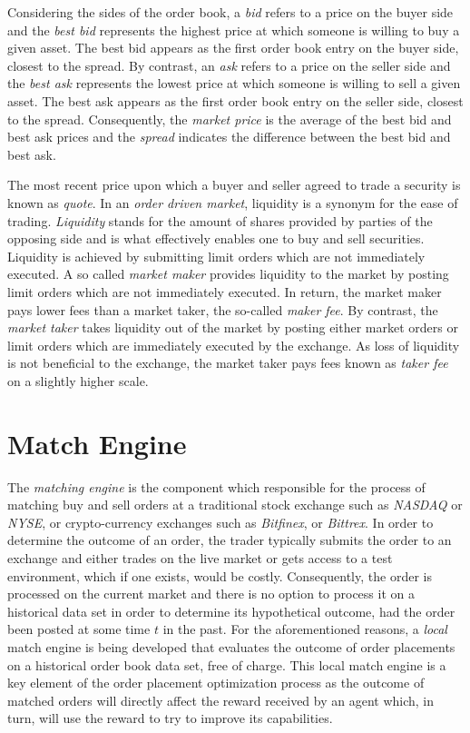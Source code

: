 Considering the sides of the order book, a \textit{bid} refers to a price on the buyer side and the \textit{best bid} represents the highest price at which someone is willing to buy a given asset.
The best bid appears as the first order book entry on the buyer side, closest to the spread.
By contrast, an \textit{ask} refers to a price on the seller side and the \textit{best ask} represents the lowest price at which someone is willing to sell a given asset. 
The best ask appears as the first order book entry on the seller side, closest to the spread.
Consequently, the \textit{market price} is the average of the best bid and best ask prices and the \textit{spread} indicates the difference between the best bid and best ask.

The most recent price upon which a buyer and seller agreed to trade a security is known as \textit{quote}.
In an \textit{order driven market}, liquidity is a synonym for the ease of trading.
\textit{Liquidity} stands for the amount of shares provided by parties of the opposing side and is what effectively enables one to buy and sell securities.
Liquidity is achieved by submitting limit orders which are not immediately executed.
A so called \textit{market maker} provides liquidity to the market by posting limit orders which are not immediately executed.
In return, the market maker pays lower fees than a market taker, the so-called \textit{maker fee}.
By contrast, the \textit{market taker} takes liquidity out of the market by posting either market orders or limit orders which are immediately executed by the exchange.
As loss of liquidity is not beneficial to the exchange, the market taker pays fees known as \textit{taker fee} on a slightly higher scale.

\section{Match Engine}
\label{sec:match-engine}

The \textit{matching engine} is the component which responsible for the process of matching buy and sell orders at a traditional stock exchange such as \textit{NASDAQ} or \textit{NYSE}, or crypto-currency exchanges such as \textit{Bitfinex}, or \textit{Bittrex}.
In order to determine the outcome of an order, the trader typically submits the order to an exchange and either trades on the live market or gets access to a test environment, which if one exists, would be costly.
Consequently, the order is processed on the current market and there is no option to process it on a historical data set in order to determine its hypothetical outcome, had the order been posted at some time $t$ in the past.
For the aforementioned reasons, a \textit{local} match engine is being developed that evaluates the outcome of order placements on a historical order book data set, free of charge.
This local match engine is a key element of the order placement optimization process as the outcome of matched orders will directly affect the reward received by an agent which, in turn, will use the reward to try to improve its capabilities.

